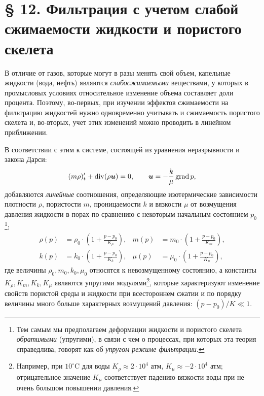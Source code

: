 \section*{§ 12. Фильтрация с учетом слабой сжимаемости жидкости и пористого скелета}
В отличие от газов, которые могут в разы менять свой объем, капельные жидкости (вода, нефть) являются \textit{слабосжимаемыми} веществами, у которых в промысловых условиях относительное изменение объема составляет доли процента. Поэтому, во-первых, при изучении эффектов сжимаемости на фильтрацию жидкостей нужно одновременно учитывать и сжимаемость пористого скелета и, во-вторых, учет этих изменений можно проводить в линейном приближении.

В соответствии с этим к системе, состоящей из уравнения неразрывности и закона Дарси:
\[
(m\rho)'_t+\operatorname{div}(\rho\boldsymbol u)=0,\qquad \boldsymbol u=-\frac{k}{\mu}\operatorname{grad} p,
\]
добавляются \textit{линейные} соотношения, определяющие изотермические зависимости плотности $\rho$, пористости $m$, проницаемости $k$ и вязкости $\mu$ от возмущения давления жидкости в порах по сравнению с некоторым начальным состоянием $p_0$\footnote{Тем самым мы предполагаем деформации жидкости и пористого скелета \textit{обратимыми} (упругими), в связи с чем о процессах, при которых эта теория справедлива, говорят как об \textit{упругом режиме фильтрации}.}:
\begin{equation}\begin{aligned}
\rho(p)&=\rho_0\cdot\left(1+\frac{p-p_0}{K_\rho}\right),&m(p)&=m_0\cdot\left(1+\frac{p-p_0}{K_m}\right),\\
k(p)&=k_0\cdot\left(1+\frac{p-p_0}{K_k}\right),&\mu(p)&=\mu_0\cdot\left(1+\frac{p-p_0}{K_\mu}\right),
\end{aligned}\tag{12.1}\label{q8:eq-12-1}\end{equation}
где величины $\rho_0,m_0,k_0,\mu_0$ относятся к невозмущенному состоянию, а константы $K_\rho,K_m,K_k,K_\mu$ являются упругими модулями\footnote{Например, при $10^\circ$C для воды $K_\rho\approx2\cdot10^4$ атм, $K_\mu\approx-2\cdot10^4$ атм; отрицательное значение $K_\mu$ соответствует падению вязкости воды при не очень большом повышении давления.}, которые характеризуют изменение свойств пористой среды и жидкости при всестороннем сжатии и по порядку величины много больше характерных возмущений давления: $(p-p_0)/K\ll1$.

